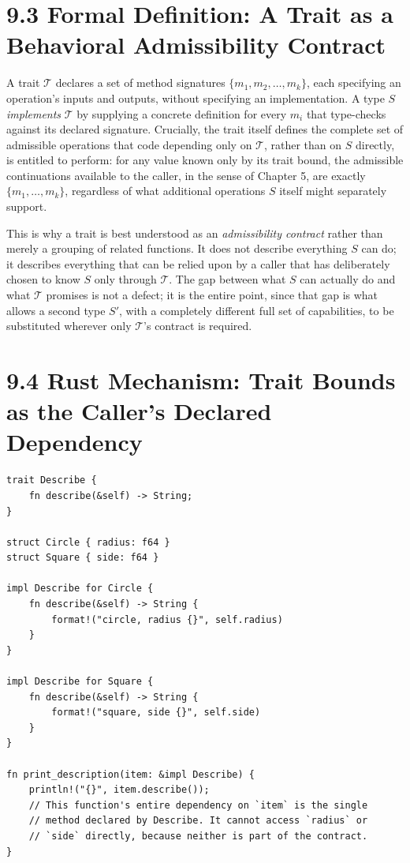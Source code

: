\documentclass[11pt]{book}
\begin{document}
\section*{9.3 Formal Definition: A Trait as a Behavioral Admissibility Contract}

A trait $\mathcal{T}$ declares a set of method signatures $\{ m_1, m_2, \ldots, m_k \}$, each specifying an operation's inputs and outputs, without specifying an implementation. A type $S$ \emph{implements} $\mathcal{T}$ by supplying a concrete definition for every $m_i$ that type-checks against its declared signature. Crucially, the trait itself defines the complete set of admissible operations that code depending only on $\mathcal{T}$, rather than on $S$ directly, is entitled to perform: for any value known only by its trait bound, the admissible continuations available to the caller, in the sense of Chapter 5, are exactly $\{ m_1, \ldots, m_k \}$, regardless of what additional operations $S$ itself might separately support.

This is why a trait is best understood as an \emph{admissibility contract} rather than merely a grouping of related functions. It does not describe everything $S$ can do; it describes everything that can be relied upon by a caller that has deliberately chosen to know $S$ only through $\mathcal{T}$. The gap between what $S$ can actually do and what $\mathcal{T}$ promises is not a defect; it is the entire point, since that gap is what allows a second type $S'$, with a completely different full set of capabilities, to be substituted wherever only $\mathcal{T}$'s contract is required.

\section*{9.4 Rust Mechanism: Trait Bounds as the Caller's Declared Dependency}

\begin{lstlisting}
trait Describe {
    fn describe(&self) -> String;
}

struct Circle { radius: f64 }
struct Square { side: f64 }

impl Describe for Circle {
    fn describe(&self) -> String {
        format!("circle, radius {}", self.radius)
    }
}

impl Describe for Square {
    fn describe(&self) -> String {
        format!("square, side {}", self.side)
    }
}

fn print_description(item: &impl Describe) {
    println!("{}", item.describe());
    // This function's entire dependency on `item` is the single
    // method declared by Describe. It cannot access `radius` or
    // `side` directly, because neither is part of the contract.
}
\end{lstlisting}
\end{document}
